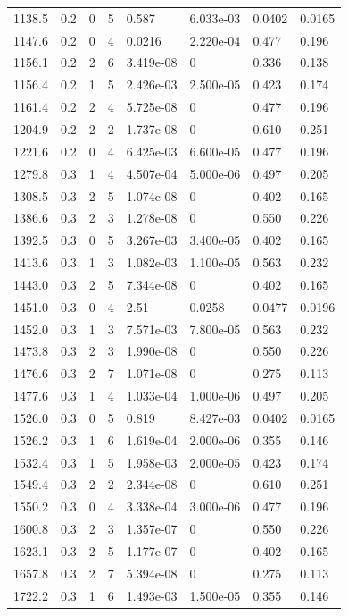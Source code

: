 \documentclass[preview]{standalone}
\begin{document}
{{{\begin{tabular}{L{1.2cm}C{1.2cm} C{0.3cm}C{0.5cm} C{1.4cm}C{1.4cm} C{1.4cm}C{1.4cm}}
  1138.5  &   0.2  & 0     &  5 &  0.587  & 6.033e-03  & 0.0402 &  0.0165   \\ 
  1147.6  &   0.2  & 0     &  4 &  0.0216  & 2.220e-04  & 0.477 &  0.196   \\ 
  1156.1  &   0.2  & 2     &  6 &  3.419e-08  & 0  & 0.336 &  0.138   \\ 
  1156.4  &   0.2  & 1     &  5 &  2.426e-03  & 2.500e-05  & 0.423 &  0.174   \\ 
  1161.4  &   0.2  & 2     &  4 &  5.725e-08  & 0  & 0.477 &  0.196   \\ 
  1204.9  &   0.2  & 2     &  2 &  1.737e-08  & 0  & 0.610 &  0.251   \\ 
  1221.6  &   0.2  & 0     &  4 &  6.425e-03  & 6.600e-05  & 0.477 &  0.196   \\ 
  1279.8  &   0.3  & 1     &  4 &  4.507e-04  & 5.000e-06  & 0.497 &  0.205   \\ 
  1308.5  &   0.3  & 2     &  5 &  1.074e-08  & 0  & 0.402 &  0.165   \\ 
  1386.6  &   0.3  & 2     &  3 &  1.278e-08  & 0  & 0.550 &  0.226   \\ 
  1392.5  &   0.3  & 0     &  5 &  3.267e-03  & 3.400e-05  & 0.402 &  0.165   \\ 
  1413.6  &   0.3  & 1     &  3 &  1.082e-03  & 1.100e-05  & 0.563 &  0.232   \\ 
  1443.0  &   0.3  & 2     &  5 &  7.344e-08  & 0  & 0.402 &  0.165   \\ 
  1451.0  &   0.3  & 0     &  4 &  2.51  & 0.0258  & 0.0477 &  0.0196   \\ 
  1452.0  &   0.3  & 1     &  3 &  7.571e-03  & 7.800e-05  & 0.563 &  0.232   \\ 
  1473.8  &   0.3  & 2     &  3 &  1.990e-08  & 0  & 0.550 &  0.226   \\ 
  1476.6  &   0.3  & 2     &  7 &  1.071e-08  & 0  & 0.275 &  0.113   \\ 
  1477.6  &   0.3  & 1     &  4 &  1.033e-04  & 1.000e-06  & 0.497 &  0.205   \\ 
  1526.0  &   0.3  & 0     &  5 &  0.819  & 8.427e-03  & 0.0402 &  0.0165   \\ 
  1526.2  &   0.3  & 1     &  6 &  1.619e-04  & 2.000e-06  & 0.355 &  0.146   \\ 
  1532.4  &   0.3  & 1     &  5 &  1.958e-03  & 2.000e-05  & 0.423 &  0.174   \\ 
  1549.4  &   0.3  & 2     &  2 &  2.344e-08  & 0  & 0.610 &  0.251   \\ 
  1550.2  &   0.3  & 0     &  4 &  3.338e-04  & 3.000e-06  & 0.477 &  0.196   \\ 
  1600.8  &   0.3  & 2     &  3 &  1.357e-07  & 0  & 0.550 &  0.226   \\ 
  1623.1  &   0.3  & 2     &  5 &  1.177e-07  & 0  & 0.402 &  0.165   \\ 
  1657.8  &   0.3  & 2     &  7 &  5.394e-08  & 0  & 0.275 &  0.113   \\ 
  1722.2  &   0.3  & 1     &  6 &  1.493e-03  & 1.500e-05  & 0.355 &  0.146   \\ 
\hline 
\end{tabular} 

}}}
\end{document}
